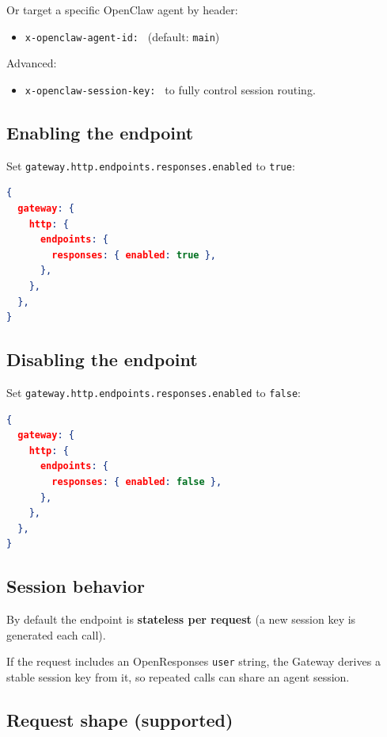 Or target a specific OpenClaw agent by header:

\begin{itemize}
  \item \texttt{x-openclaw-agent-id: } (default: \texttt{main})
\end{itemize}


Advanced:

\begin{itemize}
  \item \texttt{x-openclaw-session-key: } to fully control session routing.
\end{itemize}


\subsection{Enabling the endpoint}


Set \texttt{gateway.http.endpoints.responses.enabled} to \texttt{true}:

\begin{lstlisting}[language=json]
{
  gateway: {
    http: {
      endpoints: {
        responses: { enabled: true },
      },
    },
  },
}
\end{lstlisting}


\subsection{Disabling the endpoint}


Set \texttt{gateway.http.endpoints.responses.enabled} to \texttt{false}:

\begin{lstlisting}[language=json]
{
  gateway: {
    http: {
      endpoints: {
        responses: { enabled: false },
      },
    },
  },
}
\end{lstlisting}


\subsection{Session behavior}


By default the endpoint is \textbf{stateless per request} (a new session key is generated each call).

If the request includes an OpenResponses \texttt{user} string, the Gateway derives a stable session key
from it, so repeated calls can share an agent session.

\subsection{Request shape (supported)}


